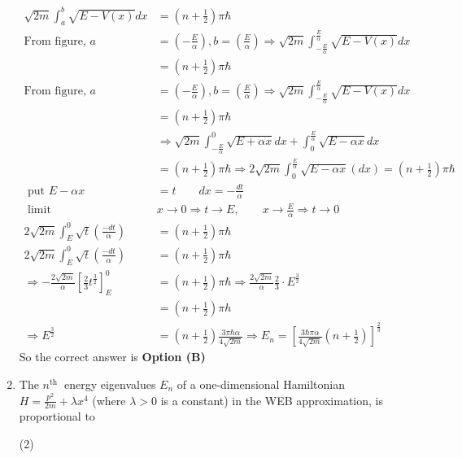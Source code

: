 \begin{enumerate}
\begin{answer}
$$\begin{aligned}
\sqrt{2 m} \int_{a}^{b} \sqrt{E-V(x)} d x&=\left(n+\frac{1}{2}\right) \pi \hbar\\
\text{From figure, }a&=\left(-\frac{E}{\alpha}\right), b=\left(\frac{E}{\alpha}\right) \Rightarrow \sqrt{2 m} \int_{-\frac{E}{\alpha}}^{\frac{E}{\alpha}} \sqrt{E-V(x)} d x\\&=\left(n+\frac{1}{2}\right) \pi \hbar\\
\text{From figure, }a&=\left(-\frac{E}{\alpha}\right), b=\left(\frac{E}{\alpha}\right) \Rightarrow \sqrt{2 m} \int_{-\frac{E}{\alpha}}^{\frac{E}{\alpha}} \sqrt{E-V(x)} d x\\&=\left(n+\frac{1}{2}\right) \pi \hbar\\
&\Rightarrow \sqrt{2 m} \int_{-\frac{E}{\alpha}}^{0} \sqrt{E+\alpha x} d x+\int_{0}^{\frac{E}{\alpha}} \sqrt{E-\alpha x} d x\\&=\left(n+\frac{1}{2}\right) \pi \hbar \Rightarrow 2 \sqrt{2 m} \int_{0}^{\frac{E}{\alpha}} \sqrt{E-\alpha x}(d x)=\left(n+\frac{1}{2}\right) \pi \hbar\\
\text{	put }E-\alpha x&=t\quad\quad
d x=-\frac{d t}{\alpha}\\
\text{	limit }&x \rightarrow 0 \Rightarrow t \rightarrow E, \quad \quad x \rightarrow \frac{E}{\alpha} \Rightarrow t \rightarrow 0\\
2 \sqrt{2 m} \int_{E}^{0} \sqrt{t}\left(\frac{-d t}{\alpha}\right)&=\left(n+\frac{1}{2}\right) \pi \hbar\\
2 \sqrt{2 m} \int_{E}^{0} \sqrt{t}\left(\frac{-d t}{\alpha}\right)&=\left(n+\frac{1}{2}\right) \pi \hbar\\
\Rightarrow-\frac{2 \sqrt{2 m}}{\alpha}\left[\frac{2}{3} t^{\frac{3}{2}}\right]_{E}^{0}&=\left(n+\frac{1}{2}\right) \pi \hbar \Rightarrow \frac{2 \sqrt{2 m}}{\alpha} \frac{2}{3} \cdot E^{\frac{3}{2}}\\&=\left(n+\frac{1}{2}\right) \pi h\\
\Rightarrow E^{\frac{3}{2}}&=\left(n+\frac{1}{2}\right) \frac{3 \pi \hbar \alpha}{4 \sqrt{2 m}} \Rightarrow E_{n}=\left[\frac{3 \hbar \pi \alpha}{4 \sqrt{2 m}}\left(n+\frac{1}{2}\right)\right]^{\frac{2}{3}}
\end{aligned}
$$
So the correct answer is \textbf{Option (B)}
\end{answer}
\item 	The $n^{\text {th }}$ energy eigenvalues $E_{n}$ of a one-dimensional Hamiltonian $H=\frac{p^{2}}{2 m}+\lambda x^{4}$ (where $\lambda>0$ is a constant) in the WEB approximation, is proportional to
{}
\begin{tasks}(2)

\end{tasks}
\end{enumerate}
